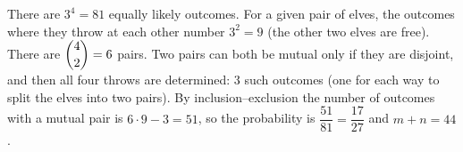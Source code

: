 There are $3^4=81$ equally likely outcomes. For a given pair of elves, the outcomes where they throw at each other number $3^2=9$ (the other two elves are free). There are $\dbinom42=6$ pairs. Two pairs can both be mutual only if they are disjoint, and then all four throws are determined: $3$ such outcomes (one for each way to split the elves into two pairs). By inclusion--exclusion the number of outcomes with a mutual pair is $6\cdot9-3=51$, so the probability is $\dfrac{51}{81}=\dfrac{17}{27}$ and $m+n=\boxed{44}$.
